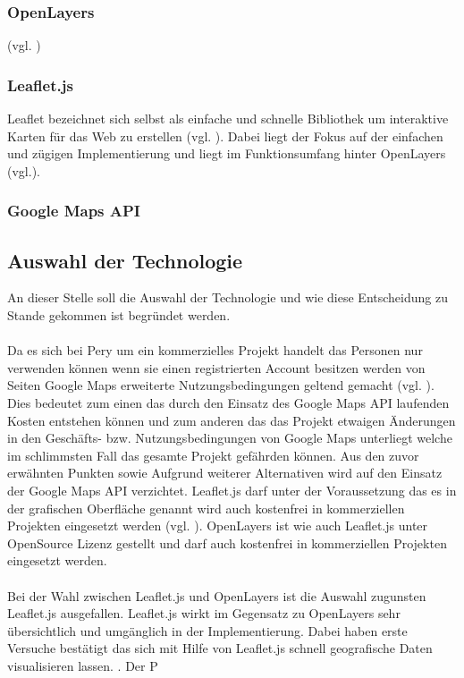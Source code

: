 \documentclass[../Bachelorarbeit.tex]{subfiles}
\begin{document}
\subsubsection{OpenLayers}
(vgl. \cite{Openlayers})

\subsubsection{Leaflet.js}
Leaflet bezeichnet sich selbst als einfache und schnelle Bibliothek um interaktive Karten für das Web zu erstellen (vgl. \cite{Leaflet}). 
Dabei liegt der Fokus auf der einfachen und zügigen Implementierung und liegt im Funktionsumfang hinter OpenLayers (vgl.\cite{VergleichApi}).

\subsubsection{Google Maps API}

\subsection{Auswahl der Technologie}
An dieser Stelle soll die Auswahl der Technologie und wie diese Entscheidung zu Stande gekommen ist begründet werden. \\
\\
Da es sich bei Pery um ein kommerzielles Projekt handelt das Personen nur verwenden können wenn sie einen registrierten Account besitzen werden von Seiten Google Maps erweiterte Nutzungsbedingungen geltend gemacht (vgl. \cite[Abschnitt: Can I use the Google Maps APIs on a site that is password protected?]{GoogleMapsApiUsage}). 
Dies bedeutet zum einen das durch den Einsatz des Google Maps API laufenden Kosten entstehen können und zum anderen das das Projekt etwaigen Änderungen in den Geschäfts- bzw. Nutzungsbedingungen von Google Maps unterliegt welche im schlimmsten Fall das gesamte Projekt gefährden können.
Aus den zuvor erwähnten Punkten sowie Aufgrund weiterer Alternativen wird auf den Einsatz der Google Maps API verzichtet.
Leaflet.js darf unter der Voraussetzung das es in der grafischen Oberfläche genannt wird auch  kostenfrei in kommerziellen Projekten eingesetzt werden (vgl. \cite[Abschnitt: Commercial Use and Licensing]{LeafletLicense}).
OpenLayers ist wie auch Leaflet.js unter OpenSource Lizenz gestellt und darf auch kostenfrei in kommerziellen Projekten eingesetzt werden.\\
\\
Bei der Wahl zwischen Leaflet.js und OpenLayers ist die Auswahl zugunsten Leaflet.js ausgefallen. 
Leaflet.js wirkt im Gegensatz zu OpenLayers sehr übersichtlich und umgänglich in der Implementierung. 
Dabei haben erste Versuche bestätigt das sich mit Hilfe von Leaflet.js schnell geografische Daten visualisieren lassen. 
. 
Der P 
\end{document}
